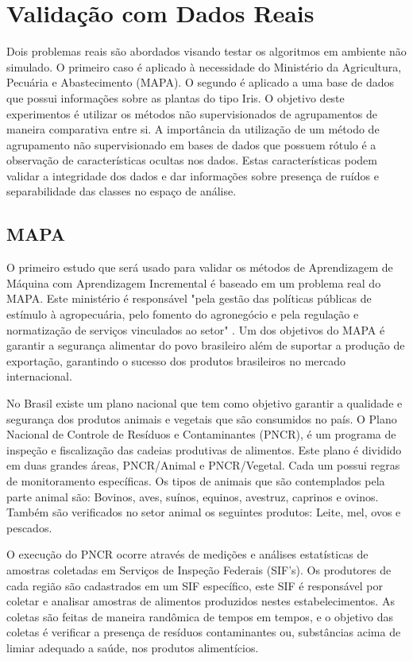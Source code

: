 \chapter{Validação com Dados Reais}
Dois problemas reais são abordados visando testar os algoritmos em ambiente não simulado. O primeiro caso é aplicado à necessidade do Ministério da Agricultura, Pecuária e Abastecimento (MAPA). O segundo é aplicado a uma base de dados que possui informações sobre as plantas do tipo Iris. O objetivo deste experimentos é utilizar os métodos não supervisionados de agrupamentos de maneira comparativa entre si. A importância da utilização de um método de agrupamento não supervisionado em bases de dados que possuem rótulo é a observação de características ocultas nos dados. Estas características podem validar a integridade dos dados e dar informações sobre presença de ruídos e separabilidade das classes no espaço de análise.  

\section{MAPA}
O primeiro estudo que será usado para validar os métodos de Aprendizagem de Máquina com Aprendizagem Incremental é baseado em um problema real do MAPA. Este ministério é responsável  "pela gestão das políticas públicas de estímulo à agropecuária, pelo fomento do agronegócio e pela regulação e normatização de serviços vinculados ao setor" \cite{mapa}. Um dos objetivos do MAPA é garantir a segurança alimentar do povo brasileiro além de suportar a produção de exportação, garantindo o sucesso dos produtos brasileiros no mercado internacional.

No Brasil existe um plano nacional que tem como objetivo garantir a qualidade e segurança dos produtos animais e vegetais que são consumidos no país. O Plano Nacional de Controle de Resíduos e Contaminantes (PNCR), é um programa de inspeção e fiscalização das cadeias produtivas de alimentos. Este plano é dividido em duas grandes áreas, PNCR/Animal e PNCR/Vegetal. Cada um possui regras de monitoramento específicas. Os tipos de animais que são contemplados pela parte animal são: Bovinos, aves, suínos, equinos, avestruz, caprinos e ovinos. Também são verificados no setor animal os seguintes produtos: Leite, mel, ovos e pescados. 

O execução do PNCR ocorre através de medições e análises estatísticas de amostras coletadas em Serviços de Inspeção Federais (SIF's). Os produtores de cada região são cadastrados em um SIF específico, este SIF é responsável por coletar e analisar amostras de alimentos produzidos nestes estabelecimentos. As coletas são feitas de maneira randômica de tempos em tempos, e o objetivo das coletas é verificar a presença de resíduos contaminantes ou, substâncias acima de limiar adequado a saúde, nos produtos alimentícios. 

